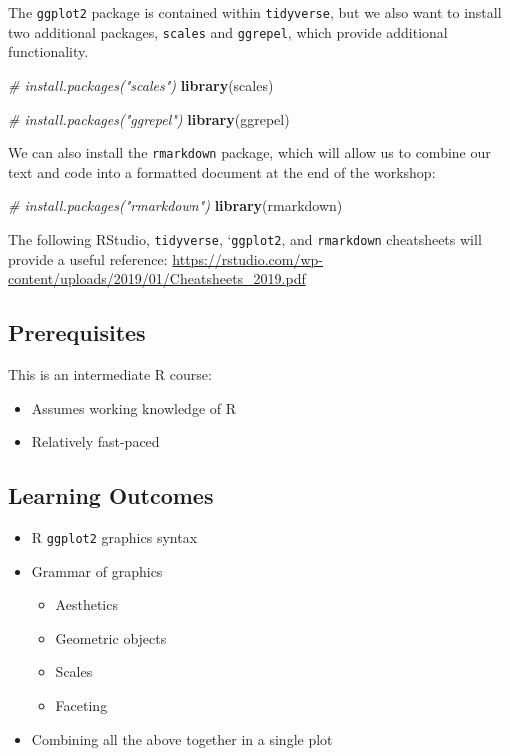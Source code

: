 \documentclass[]{book}
\newenvironment{Shaded}{\begin{snugshade}}{\end{snugshade}}
\newcommand{\CommentTok}[1]{\textcolor[rgb]{0.56,0.35,0.01}{\textit{#1}}}
\newcommand{\KeywordTok}[1]{\textcolor[rgb]{0.13,0.29,0.53}{\textbf{#1}}}
\newcommand{\NormalTok}[1]{#1}
\providecommand{\tightlist}{%
  \setlength{\itemsep}{0pt}\setlength{\parskip}{0pt}}
\begin{document}
The \texttt{ggplot2} package is contained within \texttt{tidyverse}, but we also want to
install two additional packages, \texttt{scales} and \texttt{ggrepel}, which provide
additional functionality.

\begin{Shaded}
\begin{Highlighting}[]
\CommentTok{# install.packages("scales")}
\KeywordTok{library}\NormalTok{(scales)}

\CommentTok{# install.packages("ggrepel") }
\KeywordTok{library}\NormalTok{(ggrepel)}
\end{Highlighting}
\end{Shaded}

We can also install the \texttt{rmarkdown} package, which will allow us to
combine our text and code into a formatted document at the end of
the workshop:

\begin{Shaded}
\begin{Highlighting}[]
\CommentTok{# install.packages("rmarkdown")}
\KeywordTok{library}\NormalTok{(rmarkdown)}
\end{Highlighting}
\end{Shaded}

The following RStudio, \texttt{tidyverse}, `\texttt{ggplot2}, and \texttt{rmarkdown} cheatsheets will provide a
useful reference: \url{https://rstudio.com/wp-content/uploads/2019/01/Cheatsheets_2019.pdf}

\hypertarget{prerequisites-2}{%
\subsection{Prerequisites}\label{prerequisites-2}}

This is an intermediate R course:

\begin{itemize}
\tightlist
\item
  Assumes working knowledge of R
\item
  Relatively fast-paced
\end{itemize}

\hypertarget{learning-outcomes-2}{%
\subsection{Learning Outcomes}\label{learning-outcomes-2}}

\begin{itemize}
\tightlist
\item
  R \texttt{ggplot2} graphics syntax
\item
  Grammar of graphics

  \begin{itemize}
  \tightlist
  \item
    Aesthetics
  \item
    Geometric objects
  \item
    Scales
  \item
    Faceting
  \end{itemize}
\item
  Combining all the above together in a single plot
\end{itemize}
\end{document}
